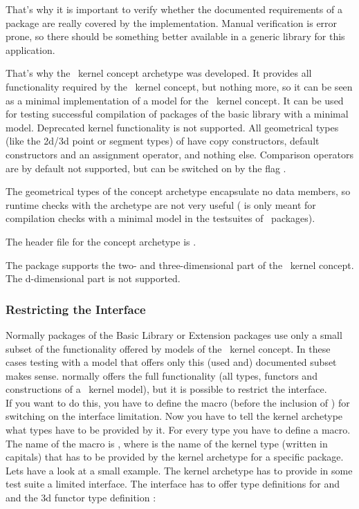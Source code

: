 That's why it is important to verify whether the documented requirements of a
package are really covered by the implementation. Manual verification is error
prone, so there should be something better available in a generic library for
this application.

That's why the \cgal\ kernel concept archetype  was
developed. It provides all functionality required by the \cgal\ kernel concept,
but nothing more, so it can be seen as a minimal implementation of a model for
the \cgal\ kernel concept.  It can be used for testing successful compilation of
packages of the basic library with a minimal model. Deprecated kernel
functionality is not supported. All geometrical types (like the 2d/3d point or
segment types) of  have copy constructors, default
constructors and an assignment operator, and nothing else.  Comparison
operators are by default not supported, but can be switched on by the flag .

The geometrical types of the concept archetype encapsulate no data members, so
runtime checks with the archetype are not very useful
( is only meant for compilation checks with a
minimal model in the testsuites of \cgal\ packages).

The header file for the concept archetype is .

The package supports the two- and three-dimensional part of the \cgal\ kernel
concept. The d-dimensional part is not supported.

\subsubsection{Restricting the Interface}

Normally packages of the Basic Library or Extension packages use only a small
subset of the functionality offered by models of the \cgal\ kernel concept. In
these cases testing with a model that offers only this (used and) documented
subset makes sense.  normally offers the full
functionality (all types, functors and constructions of a \cgal\ kernel model),
but it is possible to restrict the interface.\\ If you want to do this, you
have to define the macro  (before the
inclusion of ) for switching on the interface
limitation. Now you have to tell the kernel archetype what types have to be
provided by it. For every type you have to define a macro.  The name of the
macro is , where  is the name of the kernel type (written in capitals)
that has to be provided by the kernel archetype for a specific package.  Lets
have a look at a small example. The kernel archetype has to provide in some
test suite a limited interface.  The interface has to offer type definitions
for  and  and the 3d  functor type
definition :

